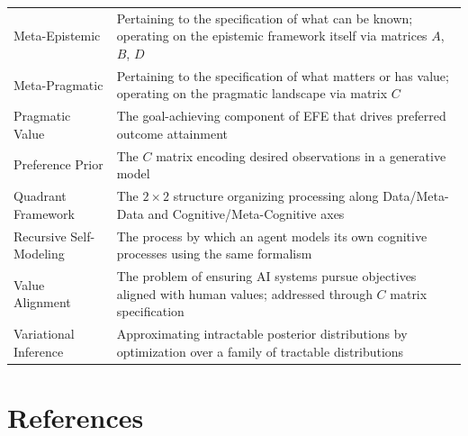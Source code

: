 \documentclass[
]{article}
\begin{document}
{\begin{longtable}[]{@{}
  >{\raggedright\arraybackslash}p{}
  >{\raggedright\arraybackslash}p{}@{}}
Meta-Epistemic & Pertaining to the specification of what can be known;
operating on the epistemic framework itself via matrices \(A\), \(B\),
\(D\) \\
Meta-Pragmatic & Pertaining to the specification of what matters or has
value; operating on the pragmatic landscape via matrix \(C\) \\
Pragmatic Value & The goal-achieving component of EFE that drives
preferred outcome attainment \\
Preference Prior & The \(C\) matrix encoding desired observations in a
generative model \\
Quadrant Framework & The \(2 \times 2\) structure organizing processing
along Data/Meta-Data and Cognitive/Meta-Cognitive axes \\
Recursive Self-Modeling & The process by which an agent models its own
cognitive processes using the same formalism \\
Value Alignment & The problem of ensuring AI systems pursue objectives
aligned with human values; addressed through \(C\) matrix
specification \\
Variational Inference & Approximating intractable posterior
distributions by optimization over a family of tractable
distributions \\
\end{longtable}
}

\newpage

\section{References}\label{sec:references}

\nocite{*}

\end{document}

